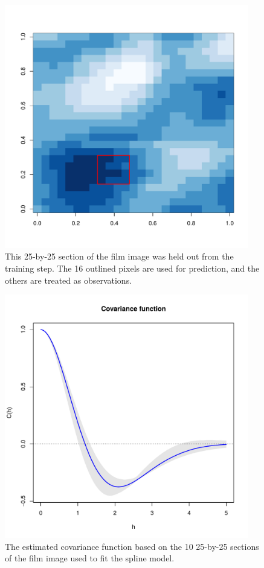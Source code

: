 \documentclass[12pt]{article}
\begin{document}
\begin{figure}[htbp]
  \centering
  \includegraphics[width=0.95\textwidth]{col_pred.pdf}
  \caption{This 25-by-25 section of the film image was held out from the training step. The 16 outlined pixels are used for prediction, and the others are treated as observations.}
  \label{fig:pred25}
\end{figure}

\begin{figure}[htbp]
  \centering
  \includegraphics[width=0.95\textwidth]{covariance_realdata.pdf}
  \caption{The estimated covariance function based on the 10 25-by-25 sections of the film image used to fit the spline model.}
  \label{fig:covariance-realdata}
\end{figure}
\end{document}

